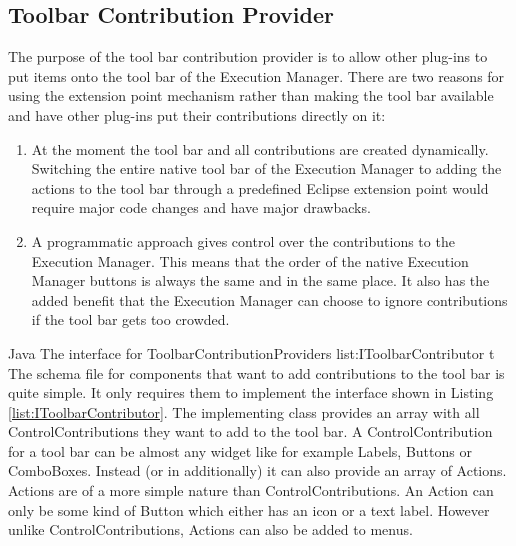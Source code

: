 \subsection{Toolbar Contribution Provider}
\label{section:ToolbarContributionProvider}
The purpose of the tool bar contribution provider is to allow other plug-ins to put
items onto the tool bar of the Execution Manager. 
There are two reasons for using the extension point mechanism
rather than making the tool bar available and have other plug-ins put their
contributions directly on it:
\begin{enumerate}
 \item At the moment the tool bar and all contributions are created dynamically. Switching
the entire native tool bar of the Execution Manager to adding the actions to the tool bar
through a predefined Eclipse extension point would require major code changes and
have major drawbacks.
 \item A programmatic approach gives control over the contributions to the Execution Manager.
This means that the order of the native Execution Manager buttons is always the same and in the
same place. It also has the added benefit that the Execution Manager can choose to ignore contributions if the
tool bar gets too crowded.
\end{enumerate}
\listingjava
{}
{Java}
{The interface for ToolbarContributionProviders}
{list:IToolbarContributor}
{t}
The schema file for components that want to add contributions to the tool bar is quite simple.
It only requires them to implement the interface shown in Listing \ref{list:IToolbarContributor}.
The implementing class provides an array with all ControlContributions they want to add to the tool bar.
A ControlContribution for a tool bar can be almost any widget like for example Labels, Buttons or ComboBoxes.
Instead (or in additionally) it can also provide an array of Actions. Actions are of a more simple nature
than ControlContributions. An Action can only be some kind of Button which either has an icon or a text label.
However unlike ControlContributions, Actions can also be added to menus.

